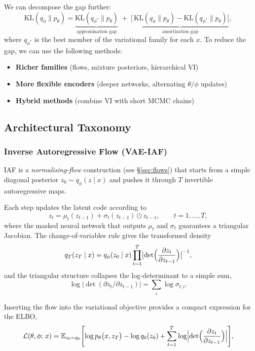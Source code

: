 \documentclass{article}
\begin{document}
We can decompose the gap further:
\[
\mathrm{KL}(q_\phi\!\|p_\theta)
  = \underbrace{\mathrm{KL}(q_{\phi^*}\!\|p_\theta)}_{\text{approximation gap}}
  \;+\;
    \underbrace{\bigl[\,\mathrm{KL}(q_\phi\!\|p_\theta)-\mathrm{KL}(q_{\phi^*}\!\|p_\theta)\bigr]}_{\text{amortization gap}},
\]
where \(q_{\phi^*}\) is the best member of the variational family for each \(x\). To reduce the gap, we can use the following methods:
\begin{itemize}
  \item \textbf{Richer families} (flows, mixture posteriors, hierarchical VI)
  \item \textbf{More flexible encoders} (deeper networks, alternating \(\theta/\phi\) updates)
  \item \textbf{Hybrid methods} (combine VI with short MCMC chains)
\end{itemize}

\subsection{Architectural Taxonomy}

\subsubsection{Inverse Autoregressive Flow (VAE-IAF)}
IAF is a \emph{normalising‑flow} construction (see \S\ref{sec:flows}) that starts from a simple diagonal posterior
\(
z_{0}\sim q_{\phi}(z\mid x)
\)
and pushes it through \(T\) invertible autoregressive maps. 

Each step updates the latent code according to
\[
    z_{t}
      = \mu_{t}(z_{t-1}) + \sigma_{t}(z_{t-1})\odot z_{t-1},
    \qquad t=1,\dots,T,
\]
where the masked neural network that outputs \(\mu_{t}\) and
\(\sigma_{t}\) guarantees a triangular Jacobian. The change‑of‑variables rule gives the transformed density
\[
    q_{T}(z_{T}\mid x)
    = q_{\phi}(z_{0}\mid x)
      \prod_{t=1}^{T}
      \bigl|\det\Bigl(\frac{\partial z_{t}}{\partial z_{t-1}}\Bigr)\bigr|^{-1},
\]
and the triangular structure collapses the log‑determinant to a simple sum,
\[
    \log\bigl|\det(\partial z_{t}/\partial z_{t-1})\bigr|
    = \sum_{i}\log\sigma_{t,i}.
\]

Inserting the flow into the variational objective provides a compact expression for the ELBO,
\[
  \mathcal{L}(\theta,\phi;\,x)
  = \mathbb{E}_{z_{0}\sim q_{0}}
    \Biggl[
        \log p_{\theta}\bigl(x,z_{T}\bigr)
        - \log q_{0}(z_{0})
        + \sum_{t=1}^{T}
            \log\Bigl|\det\Bigl(\frac{\partial z_{t}}{\partial z_{t-1}}\Bigr)\Bigr|
    \Biggr],
\]
\end{document}
